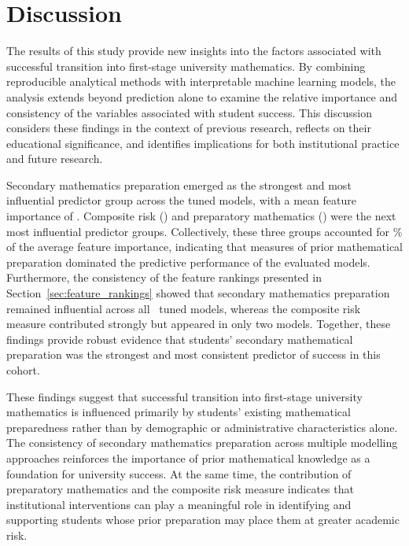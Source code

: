 %
%
%
%


\section{Discussion}
\label{sec:discussion}

The results of this study provide new insights into the factors associated with successful transition into first-stage university mathematics. 
By combining reproducible analytical methods with interpretable machine learning models, the analysis extends beyond prediction alone to examine 
the relative importance and consistency of the variables associated with student success. This discussion considers these findings in the context 
of previous research, reflects on their educational significance, and identifies implications for both institutional practice and future research.

Secondary mathematics preparation emerged as the strongest and most influential predictor group across the tuned models, with a mean feature importance 
of \SecondaryMathImportance. Composite risk (\CompositeRiskImportance) and preparatory mathematics (\PreparatoryMathImportance) were the next most influential 
predictor groups. Collectively, these three groups accounted for \TopThreeImportance\% of the average feature importance, indicating that measures of prior 
mathematical preparation dominated the predictive performance of the evaluated models.
Furthermore, the consistency of the feature rankings presented in Section~\ref{sec:feature_rankings} showed that secondary mathematics preparation remained 
influential across all \TunedModelCountWord\ tuned models, whereas the composite risk measure contributed strongly but appeared in only two models. 
Together, these findings provide robust evidence that students' secondary mathematical preparation was the strongest and most consistent predictor of success in this cohort.

These findings suggest that successful transition into first-stage university mathematics is influenced primarily by students' existing mathematical 
preparedness rather than by demographic or administrative characteristics alone. The consistency of secondary mathematics preparation across multiple 
modelling approaches reinforces the importance of prior mathematical knowledge as a foundation for university success. At the same time, the contribution 
of preparatory mathematics and the composite risk measure indicates that institutional interventions can play a meaningful role in identifying and supporting 
students whose prior preparation may place them at greater academic risk.

